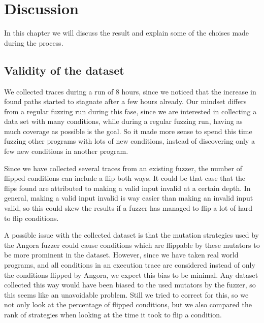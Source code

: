 
\chapter{Discussion}\label{chap:discussion} %
In this chapter we will discuss the result and explain some of the choises made during the process.




% 

\section{Validity of the dataset}
We collected traces during a run of 8 hours, since we noticed that the increase in found paths started to stagnate after a few hours already. Our mindset differs from a regular fuzzing run during this fase, since we are interested in collecting a data set with many conditions, while during a regular fuzzing run, having as much coverage as possible is the goal. So it made more sense to spend this time fuzzing other programs with lots of new conditions, instead of discovering only a few new conditions in another program. 

Since we have collected several traces from an existing fuzzer, the number of flipped conditions can include a flip both ways. 
It could be that case that the flips found are attributed to making a valid input invalid at a certain depth. In general, making a valid input invalid is way easier than making an invalid input valid, so this could skew the results if a fuzzer has managed to flip a lot of hard to flip conditions.

A possible issue with the collected dataset is that the mutation strategies used by the Angora fuzzer could cause conditions which are flippable by these mutators to be more prominent in the dataset. However, since we have taken real world programs, and all conditions in an execution trace are considered instead of only the conditions flipped by Angora, we expect this bias to be minimal. Any dataset collected this way would have been biased to the used mutators by the fuzzer, so this seems like an unavoidable problem. Still we tried to correct for this, so we not only look at the percentage of flipped conditions, but we also compared the rank of strategies when looking at the time it took to flip a condition.

